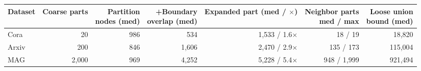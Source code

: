 \begin{tabular}{lrrrrrr}
\toprule
\textbf{Dataset} & \textbf{Coarse parts} & \shortstack{\textbf{Partition}\\\textbf{nodes (med)}} & \shortstack{\textbf{+Boundary}\\\textbf{overlap (med)}} & \shortstack{\textbf{Expanded part}\\\textbf{(med / $\times$)}} & \shortstack{\textbf{Neighbor parts}\\\textbf{med / max}} & \shortstack{\textbf{Loose union}\\\textbf{bound (med)}} \\
\midrule
Cora  & 20    & 986 & 534   & 1,533 / 1.6$\times$ & 18 / 19    & 18,820 \\
Arxiv & 200   & 846 & 1,606 & 2,470 / 2.9$\times$ & 135 / 173  & 115,004 \\
MAG   & 2,000 & 969 & 4,252 & 5,228 / 5.4$\times$ & 948 / 1,999 & 921,494 \\
\bottomrule
\end{tabular}
